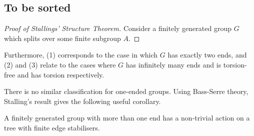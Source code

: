 \subsection{To be sorted}



\begin{proof}[Proof of Stallings' Structure Theorem]
    Consider a finitely generated group \(G\) which splits over some finite subgroup \(A\).
\end{proof}

\begin{corollary}
    Furthermore, (1) corresponds to the case in which \(G\) has exactly two ends, and (2) and (3) relate to the cases where \(G\) has infinitely many ends and is torsion-free and has torsion respectively. 
\end{corollary}

There is no similar classification for one-ended groups. Using Bass-Serre theory, Stalling's result gives the following useful corollary. %
\begin{corollary}
    A finitely generated group with more than one end has a non-trivial action on a tree with finite edge stabilisers.
\end{corollary}
\newpage %